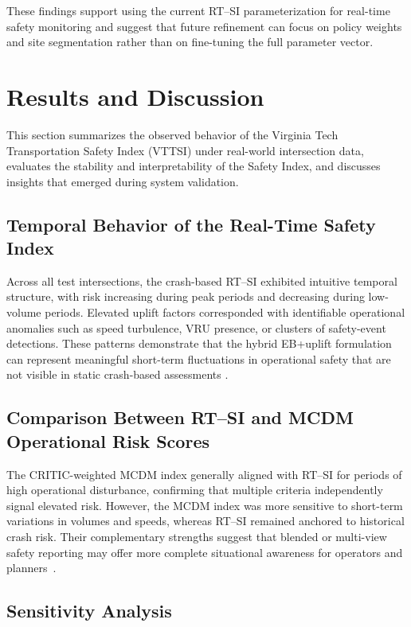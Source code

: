 \documentclass[conference]{IEEEtran}
\begin{document}
These findings support using the current RT--SI parameterization for real-time safety
monitoring and suggest that future refinement can focus on policy weights and site
segmentation rather than on fine-tuning the full parameter vector.

\section{Results and Discussion}

This section summarizes the observed behavior of the Virginia Tech Transportation Safety
Index (VTTSI) under real-world intersection data, evaluates the stability and interpretability
of the Safety Index, and discusses insights that emerged during system validation.

\subsection{Temporal Behavior of the Real-Time Safety Index}

Across all test intersections, the crash-based RT--SI exhibited intuitive temporal structure,
with risk increasing during peak periods and decreasing during low-volume periods.
Elevated uplift factors corresponded with identifiable operational anomalies such as 
speed turbulence, VRU presence, or clusters of safety-event detections. These patterns
demonstrate that the hybrid EB+uplift formulation can represent meaningful short-term
fluctuations in operational safety that are not visible in static crash-based assessments
\cite{persaud2007, montella2020systemic, schultz2025_surrogate}.

\subsection{Comparison Between RT--SI and MCDM Operational Risk Scores}

The CRITIC-weighted MCDM index generally aligned with RT--SI for periods of high
operational disturbance, confirming that multiple criteria independently signal elevated
risk. However, the MCDM index was more sensitive to short-term variations in volumes
and speeds, whereas RT--SI remained anchored to historical crash risk. Their complementary
strengths suggest that blended or multi-view safety reporting may offer more complete
situational awareness for operators and planners~\cite{Amraji2025CombinedSafetyIndex, montella2020systemic}.

\subsection{Sensitivity Analysis}
\end{document}
